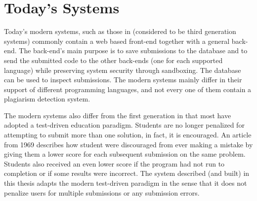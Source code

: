 \section{Today's Systems} \label{sec:todays_systems}
Today’s modern systems, such as those in \cite{Gradebot} \cite{Suleman} \cite{GenerationReview}  \cite{Kattis} \cite{Amelung} (considered to be third generation systems) commonly contain a web based front-end together with a general back-end. The back-end’s main purpose is to save submissions to the database and to send the submitted code to the other back-ends (one for each supported language) while preserving system security through sandboxing. The database can be used to inspect submissions. The modern systems mainly differ in their support of different programming languages, and not every one of them contain a plagiarism detection system.

The modern systems also differ from the first generation in that most have adopted a test-driven education paradigm. Students are no longer penalized for attempting to submit more than one solution, in fact, it is encouraged. An article from 1969 \cite{GradingScheme} describes how student were discouraged from ever making a mistake by giving them a lower score for each subsequent submission on the same problem. Students also received an even lower score if the program had not run to completion or if some results were incorrect. The system described (and built) in this thesis adapts the modern test-driven paradigm in the sense that it does not penalize users for multiple submissions or any submission errors.






